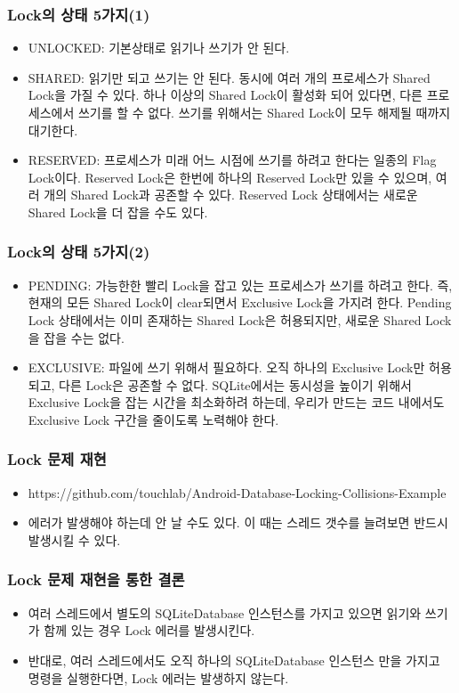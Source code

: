 \documentclass{beamer}
\begin{document}
\begin{frame}
\frametitle{Lock의 상태 5가지(1)}
\begin{itemize}
\item UNLOCKED: 기본상태로 읽기나 쓰기가 안 된다.
\item SHARED: 읽기만 되고 쓰기는 안 된다. 동시에 여러 개의 프로세스가 Shared Lock을 가질 수 있다. 하나 이상의  Shared Lock이 활성화 되어 있다면, 다른 프로세스에서 쓰기를 할 수 없다. 쓰기를 위해서는 Shared Lock이 모두 해제될 때까지 대기한다.
\item RESERVED: 프로세스가 미래 어느 시점에 쓰기를 하려고 한다는 일종의 Flag Lock이다. Reserved Lock은 한번에 하나의 Reserved Lock만 있을 수 있으며, 여러 개의 Shared Lock과 공존할 수 있다. Reserved Lock 상태에서는 새로운 Shared Lock을 더 잡을 수도 있다.
\end{itemize}
\end{frame}

\begin{frame}
\frametitle{Lock의 상태 5가지(2)}
\begin{itemize}
\item PENDING: 가능한한 빨리 Lock을 잡고 있는 프로세스가 쓰기를 하려고 한다. 즉, 현재의 모든 Shared Lock이 clear되면서 Exclusive Lock을 가지려 한다. Pending Lock 상태에서는 이미 존재하는 Shared Lock은 허용되지만, 새로운 Shared Lock을 잡을 수는 없다. 
\item EXCLUSIVE: 파일에 쓰기 위해서 필요하다. 오직 하나의 Exclusive Lock만 허용되고, 다른 Lock은 공존할 수 없다. SQLite에서는 동시성을 높이기 위해서 Exclusive Lock을 잡는 시간을 최소화하려 하는데, 우리가 만드는 코드 내에서도 Exclusive Lock 구간을 줄이도록 노력해야 한다.
\end{itemize}
\end{frame}

\begin{frame}
\frametitle{Lock 문제 재현}
\begin{itemize}
\item https://github.com/touchlab/Android-Database-Locking-Collisions-Example
\item 에러가 발생해야 하는데 안 날 수도 있다. 이 때는 스레드 갯수를 늘려보면 반드시 발생시킬 수 있다.
\end{itemize}
\end{frame}

\begin{frame}
\frametitle{Lock 문제 재현을 통한 결론}
\begin{itemize}
\item 여러 스레드에서 별도의 SQLiteDatabase 인스턴스를 가지고 있으면 읽기와 쓰기가 함께 있는 경우 Lock 에러를 발생시킨다.
\item 반대로, 여러 스레드에서도 오직 하나의 SQLiteDatabase 인스턴스 만을 가지고 명령을 실행한다면, Lock  에러는 발생하지 않는다.
\end{itemize}
\end{frame}
\end{document}
